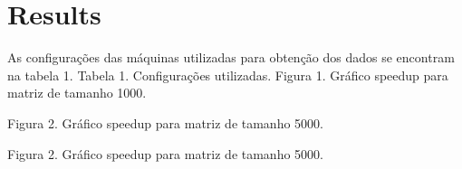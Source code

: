 \documentclass[journal, twoside]{IEEEtran}
\begin{document}
\section{Results}


\par \quad As configurações das máquinas utilizadas para obtenção dos dados se encontram na tabela 1.
\newline \newline
\centering
{}%
\newline Tabela 1. Configurações utilizadas.
\label{fig:bancada}
\hfil
{}%
\newline Figura 1. Gráfico speedup para matriz de tamanho 1000.
\label{fig:diagrama}

\label{fig:est}
\hfil
{}%
\newline Figura 2. Gráfico speedup para matriz de tamanho 5000.
\label{fig:diagrama}

\label{fig:est}
\hfil
{}%
\newline Figura 2. Gráfico speedup para matriz de tamanho 5000.
\label{fig:diagrama}
\end{document}
